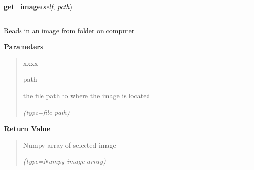 \hspace{.8\funcindent}\begin{boxedminipage}{\funcwidth}

    \raggedright \textbf{get\_image}(\textit{self}, \textit{path})

    \vspace{-1.5ex}

    \rule{\textwidth}{0.5\fboxrule}
\setlength{\parskip}{2ex}
    Reads in an image from folder on computer

\setlength{\parskip}{1ex}
      \textbf{Parameters}
      \vspace{-1ex}

      \begin{quote}
        \begin{Ventry}{xxxx}

          \item[path]

          the file path to where the image is located

            {\it (type=file path)}

        \end{Ventry}

      \end{quote}

      \textbf{Return Value}
    \vspace{-1ex}

      \begin{quote}
      Numpy array of selected image

      {\it (type=Numpy image array)}

      \end{quote}

    \end{boxedminipage}

    \label{client_gui:GuiClass:np2im}

    \vspace{0.5ex}

